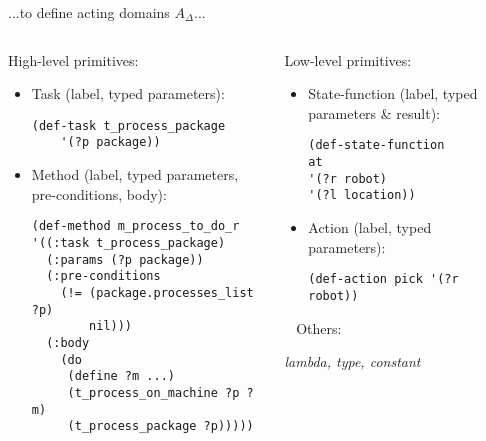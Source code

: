 \begin{frame}[fragile]{...to define acting domains $A_\Delta$...}
    \setlength{\leftmargini}{0pt}
    \begin{columns}
        \begin{column}{0.5\textwidth}
            High-level primitives:
            \begin{itemize}
                \footnotesize
                \item Task (label, typed parameters):
                \tiny
                \begin{lstlisting}
(def-task t_process_package
    '(?p package))
                \end{lstlisting}
                \footnotesize
                \item Method (label, typed parameters, pre-conditions, body):
                \tiny
                \begin{lstlisting}
(def-method m_process_to_do_r
'((:task t_process_package)
  (:params (?p package))
  (:pre-conditions
    (!= (package.processes_list ?p)
        nil)))
  (:body
    (do
     (define ?m ...)
     (t_process_on_machine ?p ?m)
     (t_process_package ?p)))))    
                \end{lstlisting}
            \end{itemize}
        \end{column}

        \begin{column}{0.5\textwidth}
            Low-level primitives:
            \begin{itemize}
            \footnotesize
            \item State-function (label, typed parameters \& result):
            \tiny
            \begin{lstlisting}
(def-state-function
at
'(?r robot)
'(?l location))
            \end{lstlisting}
            \footnotesize
            \item Action (label, typed parameters):
            \tiny
            \begin{lstlisting}
(def-action pick '(?r robot))
                \end{lstlisting}
            \end{itemize}

            ~
        \normalsize
        Others:
        
        \textit{lambda, type, constant}
        \end{column}

        

    \end{columns}
    

\end{frame}



